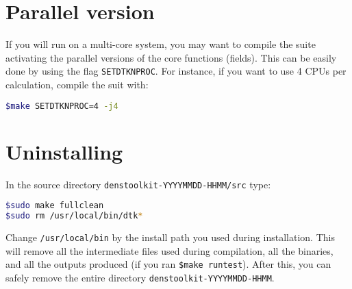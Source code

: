 \section{Parallel version}

If you will run \DTK{} on a multi-core system, you may want to compile the suite activating
the parallel versions of the core functions (fields). This can be easily done by using the
flag \texttt{SETDTKNPROC}. For instance, if you want \DTK{} to use 4 CPUs per
calculation, compile the suit with:

\begin{lstlisting}[language=bash]
$make SETDTKNPROC=4 -j4
\end{lstlisting}

\section{Uninstalling \DTK}

In the source directory \texttt{denstoolkit-YYYYMMDD-HHMM/src} type:
\begin{lstlisting}[language=bash]
$sudo make fullclean
$sudo rm /usr/local/bin/dtk*
\end{lstlisting}
Change \texttt{/usr/local/bin} by the install path you used during installation.
This will remove all the intermediate files used during compilation, all the binaries, and all the outputs produced (if you ran \texttt{\$make runtest}). After this, you can safely remove the entire directory \texttt{denstoolkit-YYYYMMDD-HHMM}.








